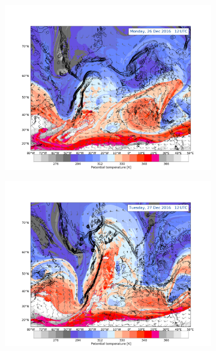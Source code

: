 \begin{figure}
	\begin{subfigure}[b]{0.49\textwidth}
		\includegraphics[trim={4.2cm 3.9cm 4.3cm 5.1cm},clip,
		width=\textwidth]{./fig_DynTropo/20161226_12}
		\caption{}\label{fig:DT26}
	\end{subfigure}
	\begin{subfigure}[b]{0.49\textwidth}
		\includegraphics[trim={4.2cm 3.9cm 4.3cm 5.1cm},clip,
		width=\textwidth]{./fig_DynTropo/20161227_12}
		\caption{}\label{fig:DT27}
	\end{subfigure}   
	\begin{subfigure}[b]{\textwidth}

\end{subfigure}
\end{figure}
